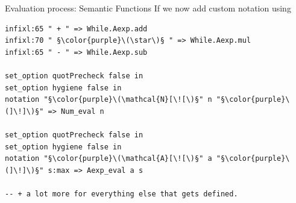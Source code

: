 \documentclass[xcolor={dvipsnames,table}]{beamer}
\begin{document}
\begin{frame}[fragile]{Evaluation process: \alert{Semantic Functions}}
    If we now add custom notation using
    \begin{lstlisting}[style=lean4, basicstyle=\scriptsize\ttfamily]
infixl:65 " + " => While.Aexp.add
infixl:70 " §\color{purple}\(\star\)§ " => While.Aexp.mul
infixl:65 " - " => While.Aexp.sub

set_option quotPrecheck false in
set_option hygiene false in
notation "§\color{purple}\(\mathcal{N}[\![\)§" n "§\color{purple}\(]\!]\)§" => Num_eval n

set_option quotPrecheck false in
set_option hygiene false in
notation "§\color{purple}\(\mathcal{A}[\![\)§" a "§\color{purple}\(]\!]\)§" s:max => Aexp_eval a s

-- + a lot more for everything else that gets defined.
    \end{lstlisting}
\end{frame}
\end{document}
